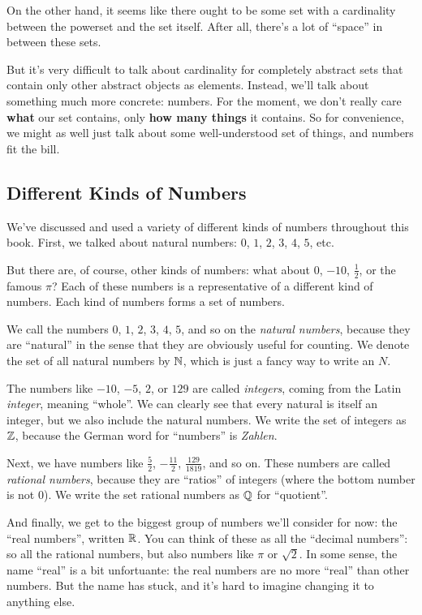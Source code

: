 On the other hand, it seems like there ought to be some set with a cardinality between the powerset and the set itself.
After all, there's a lot of ``space'' in between these sets. 

But it's very difficult to talk about cardinality for completely abstract sets that contain only other abstract objects as elements.
Instead, we'll talk about something much more concrete: numbers.
For the moment, we don't really care \textbf{what} our set contains, only \textbf{how many things} it contains.
So for convenience, we might as well just talk about some well-understood set of things, and numbers fit the bill.

\subsection{Different Kinds of Numbers}

We've discussed and used a variety of different kinds of numbers throughout this book.
First, we talked about natural numbers: $0$, $1$, $2$, $3$, $4$, $5$, etc.

But there are, of course, other kinds of numbers: what about $0$, $-10$, $\frac{1}{2}$, or the famous $\pi$?
Each of these numbers is a representative of a different kind of numbers.
Each kind of numbers forms a set of numbers.

We call the numbers $0$, $1$, $2$, $3$, $4$, $5$, and so on the \emph{natural numbers}, because they are ``natural'' in the sense that they are obviously useful for counting.
We denote the set of all natural numbers by $\mathbb{N}$, which is just a fancy way to write an $N$.

The numbers like $-10$, $-5$, $2$, or $129$ are called \emph{integers}, coming from the Latin \emph{integer}, meaning ``whole''.
We can clearly see that every natural is itself an integer, but we also include the natural numbers.
We write the set of integers as $\mathbb{Z}$, because the German word for ``numbers'' is \emph{Zahlen}.

Next, we have numbers like $\frac{5}{2}$, $-\frac{11}{2}$, $\frac{129}{1819}$, and so on.
These numbers are called \emph{rational numbers}, because they are ``ratios'' of integers (where the bottom number is not $0$).
We write the set rational numbers as $\mathbb{Q}$ for ``quotient''.

And finally, we get to the biggest group of numbers we'll consider for now: the ``real numbers'', written $\mathbb{R}$.
You can think of these as all the ``decimal numbers'': so all the rational numbers, but also numbers like $\pi$ or $\sqrt{2}$. 
In some sense, the name ``real'' is a bit unfortuante: the real numbers are no more ``real'' than other numbers.
But the name has stuck, and it's hard to imagine changing it to anything else.

